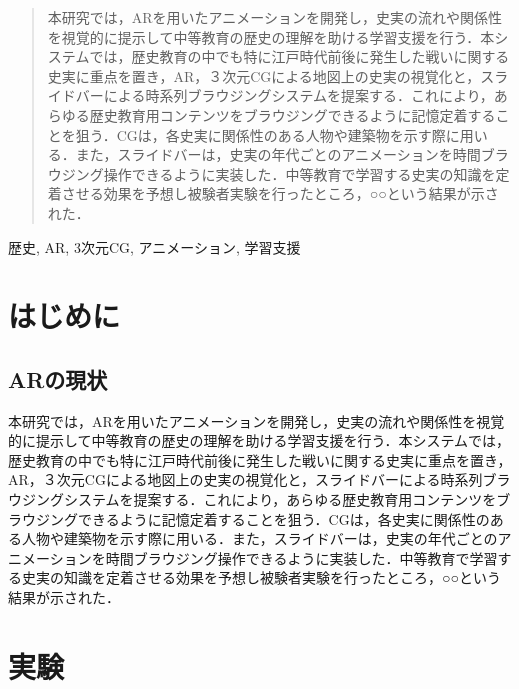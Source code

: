 \documentclass[a4paper,dvipdfmx]{hisken}
\begin{document}

\begin{abstract}
本研究では，ARを用いたアニメーションを開発し，史実の流れや関係性を視覚的に提示して中等教育の歴史の理解を助ける学習支援を行う．本システムでは，歴史教育の中でも特に江戸時代前後に発生した戦いに関する史実に重点を置き，AR，３次元CGによる地図上の史実の視覚化と，スライドバーによる時系列ブラウジングシステムを提案する．これにより，あらゆる歴史教育用コンテンツをブラウジングできるように記憶定着することを狙う．CGは，各史実に関係性のある人物や建築物を示す際に用いる．また，スライドバーは，史実の年代ごとのアニメーションを時間ブラウジング操作できるように実装した．中等教育で学習する史実の知識を定着させる効果を予想し被験者実験を行ったところ，○○という結果が示された．
\end{abstract}

\begin{keyword}	
歴史, AR, 3次元CG, アニメーション, 学習支援
\end{keyword}

\maketitle
	
\section{はじめに}
\subsection{ARの現状}
本研究では，ARを用いたアニメーションを開発し，史実の流れや関係性を視覚的に提示して中等教育の歴史の理解を助ける学習支援を行う．本システムでは，歴史教育の中でも特に江戸時代前後に発生した戦いに関する史実に重点を置き，AR，３次元CGによる地図上の史実の視覚化と，スライドバーによる時系列ブラウジングシステムを提案する．これにより，あらゆる歴史教育用コンテンツをブラウジングできるように記憶定着することを狙う．CGは，各史実に関係性のある人物や建築物を示す際に用いる．また，スライドバーは，史実の年代ごとのアニメーションを時間ブラウジング操作できるように実装した．中等教育で学習する史実の知識を定着させる効果を予想し被験者実験を行ったところ，○○という結果が示された．

\section{実験}
\end{document}
